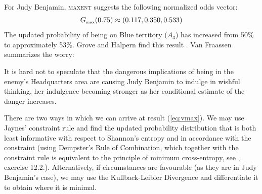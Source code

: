 \documentclass[11pt]{article}
\begin{document}
For Judy Benjamin, \textsc{maxent} suggests the following normalized
odds vector:
\begin{equation}
  \label{eq:vmax}
  G_{\mbox{{\tiny max}}}(0.75)\approx(0.117,0.350,0.533)
\end{equation}
The updated probability of being on Blue territory ($A_{3}$) has
increased from 50\% to approximately 53\%. Grove and Halpern find this
result  .
Van Fraassen summarizes the worry:
\begin{quotex}
  It is hard not to speculate that the dangerous implications of being
  in the enemy's Headquarters area are causing Judy Benjamin to
  indulge in wishful thinking, her indulgence becoming stronger as her
  conditional estimate of the danger increases. 
\end{quotex}

\bigskip

\nial There are two ways in which we can arrive at result
({\ref{eq:vmax}}). We may use Jaynes' constraint rule and find the
updated probability distribution that is both least informative with
respect to Shannon's entropy and in accordance with the constraint
(using Dempster's Rule of Combination, which together with the
constraint rule is equivalent to the principle of minimum
cross-entropy, see , exercise 12.2.).
Alternatively, if circumstances are favourable (as they are in Judy
Benjamin's case), we may use the Kullback-Leibler Divergence and
differentiate it to obtain where it is minimal.



\end{document}
